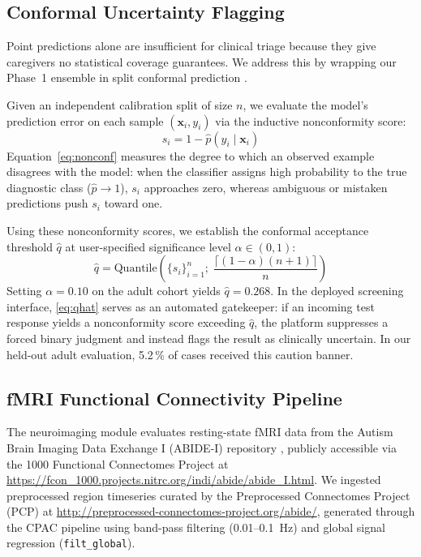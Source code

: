 \documentclass[conference]{IEEEtran}
\begin{document}
\subsection{Conformal Uncertainty Flagging}

Point predictions alone are insufficient for clinical triage because they give caregivers no statistical coverage guarantees. We address this by wrapping our Phase~1 ensemble in split conformal prediction \cite{angelopoulos2023}.

Given an independent calibration split of size $n$, we evaluate the model's prediction error on each sample $(\mathbf{x}_i, y_i)$ via the inductive nonconformity score:
\begin{equation}
  s_i = 1 - \hat{p}(y_i \mid \mathbf{x}_i)
  \label{eq:nonconf}
\end{equation}
Equation~\eqref{eq:nonconf} measures the degree to which an observed example disagrees with the model: when the classifier assigns high probability to the true diagnostic class ($\hat{p} \to 1$), $s_i$ approaches zero, whereas ambiguous or mistaken predictions push $s_i$ toward one.

Using these nonconformity scores, we establish the conformal acceptance threshold $\hat{q}$ at user-specified significance level $\alpha \in (0, 1)$:
\begin{equation}
  \hat{q} = \text{Quantile}\!\left(\{s_i\}_{i=1}^{n};\;
  \frac{\lceil(1-\alpha)(n+1)\rceil}{n}\right)
  \label{eq:qhat}
\end{equation}
Setting $\alpha = 0.10$ on the adult cohort yields $\hat{q} = 0.268$. In the deployed screening interface, \eqref{eq:qhat} serves as an automated gatekeeper: if an incoming test response yields a nonconformity score exceeding $\hat{q}$, the platform suppresses a forced binary judgment and instead flags the result as clinically uncertain. In our held-out adult evaluation, 5.2\,\% of cases received this caution banner.

\subsection{fMRI Functional Connectivity Pipeline}

The neuroimaging module evaluates resting-state fMRI data from the Autism Brain Imaging Data Exchange I (ABIDE-I) repository \cite{di2014}, publicly accessible via the 1000 Functional Connectomes Project at \url{https://fcon_1000.projects.nitrc.org/indi/abide/abide_I.html}. We ingested preprocessed region timeseries curated by the Preprocessed Connectomes Project (PCP) \cite{craddock2013pcp} at \url{http://preprocessed-connectomes-project.org/abide/}, generated through the CPAC pipeline using band-pass filtering (0.01--0.1~Hz) and global signal regression (\texttt{filt\_global}).
\end{document}

